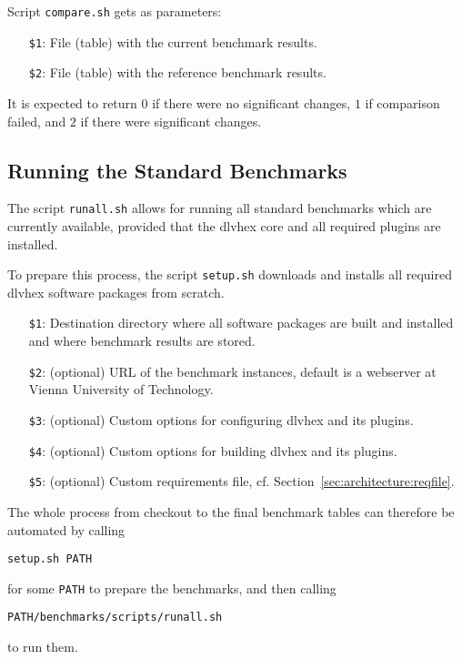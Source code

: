\documentclass[a4paper]{article}
\begin{document}
			Script {\tt compare.sh} gets as parameters:
			    \begin{itemize}
					\item[{\tt \$1}:] File (table) with the current benchmark results.
					\item[{\tt \$2}:] File (table) with the reference benchmark results.
			    \end{itemize}
			
			It is expected to return $0$ if there were no significant changes,
			$1$ if comparison failed, and $2$ if there were significant changes.

		\subsection{Running the Standard Benchmarks}

			The script {\tt runall.sh} allows for
			running all standard benchmarks which are currently available,
			provided that the {\sc dlvhex} core and all required plugins are installed.

			To prepare this process, the script {\tt setup.sh} downloads and installs all required {\sc dlvhex} software packages
			from scratch.

			\medskip{}
			\begin{itemize}
				\item[{\tt \$1}:] Destination directory where all software packages are built and installed and where benchmark results are stored.
				\item[{\tt \$2}:] (optional) URL of the benchmark instances, default is a webserver at Vienna University of Technology.
				\item[{\tt \$3}:] (optional) Custom options for configuring {\sc dlvhex} and its plugins.
				\item[{\tt \$4}:] (optional) Custom options for building {\sc dlvhex} and its plugins.
				\item[{\tt \$5}:] (optional) Custom requirements file, cf. Section~\ref{sec:architecture:reqfile}.				
			\end{itemize}

			The whole process from checkout to the final benchmark tables can therefore be automated by calling
			\begin{center}
				{\tt setup.sh PATH}
			\end{center}
			for some {\tt PATH} to prepare the benchmarks, and then calling
			\begin{center}
				{\tt PATH/benchmarks/scripts/runall.sh}
			\end{center}
			to run them.
\end{document}
